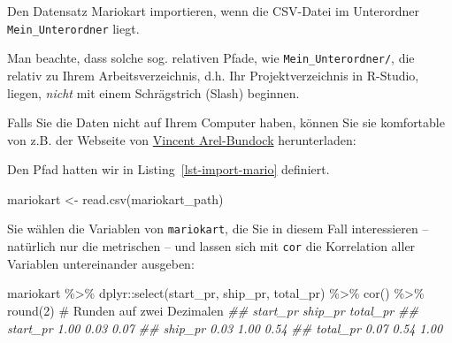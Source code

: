 \documentclass[
  letterpaper,
  oneside,
  open=any]{scrbook}
\newenvironment{Shaded}{\begin{snugshade}}{\end{snugshade}}
\newcommand{\CommentTok}[1]{\textcolor[rgb]{0.37,0.37,0.37}{#1}}
\newcommand{\DecValTok}[1]{\textcolor[rgb]{0.68,0.00,0.00}{#1}}
\newcommand{\DocumentationTok}[1]{\textcolor[rgb]{0.37,0.37,0.37}{\textit{#1}}}
\newcommand{\FunctionTok}[1]{\textcolor[rgb]{0.28,0.35,0.67}{#1}}
\newcommand{\NormalTok}[1]{\textcolor[rgb]{0.00,0.23,0.31}{#1}}
\newcommand{\OtherTok}[1]{\textcolor[rgb]{0.00,0.23,0.31}{#1}}
\newcommand{\SpecialCharTok}[1]{\textcolor[rgb]{0.37,0.37,0.37}{#1}}
\newcommand{\StringTok}[1]{\textcolor[rgb]{0.13,0.47,0.30}{#1}}
\theoremstyle{definition}
\theoremstyle{definition}
\theoremstyle{definition}
\theoremstyle{remark}
\begin{document}
\begin{codelisting}

\caption{\label{lst-mario-unterordner}Den Datensatz Mariokart
importieren, wenn die CSV-Datei im Unterordner
\texttt{Mein\_Unterordner} liegt.}

\centering{

\begin{Shaded}
\begin{Highlighting}[]
\NormalTok{mariokart }\OtherTok{\textless{}{-}} \FunctionTok{read.csv}\NormalTok{(}\StringTok{"Mein\_Unterordner/mariokart.csv"}\NormalTok{)}
\end{Highlighting}
\end{Shaded}

}

\end{codelisting}%

Man beachte, dass solche sog. relativen Pfade, wie
\texttt{Mein\_Unterordner/}, die relativ zu Ihrem Arbeitsverzeichnis,
d.h. Ihr Projektverzeichnis in R-Studio, liegen, \emph{nicht} mit einem
Schrägstrich (Slash) beginnen.

Falls Sie die Daten nicht auf Ihrem Computer haben, können Sie sie
komfortable von z.B. der Webseite von
\href{https://vincentarelbundock.github.io/Rdatasets}{Vincent
Arel-Bundock} herunterladen:

Den Pfad hatten wir in Listing~\ref{lst-import-mario} definiert.

\begin{Shaded}
\begin{Highlighting}[]
\NormalTok{mariokart }\OtherTok{\textless{}{-}} \FunctionTok{read.csv}\NormalTok{(mariokart\_path)}
\end{Highlighting}
\end{Shaded}

Sie wählen die Variablen von \texttt{mariokart}, die Sie in diesem Fall
interessieren -- natürlich nur die metrischen -- und lassen sich mit
\texttt{cor} die Korrelation aller Variablen untereinander ausgeben:

\begin{Shaded}
\begin{Highlighting}[]
\NormalTok{mariokart }\SpecialCharTok{\%\textgreater{}\%}  
\NormalTok{  dplyr}\SpecialCharTok{::}\FunctionTok{select}\NormalTok{(start\_pr, ship\_pr, total\_pr) }\SpecialCharTok{\%\textgreater{}\%} 
  \FunctionTok{cor}\NormalTok{() }\SpecialCharTok{\%\textgreater{}\%} 
  \FunctionTok{round}\NormalTok{(}\DecValTok{2}\NormalTok{) }\CommentTok{\# Runden auf zwei Dezimalen}
\DocumentationTok{\#\#          start\_pr ship\_pr total\_pr}
\DocumentationTok{\#\# start\_pr     1.00    0.03     0.07}
\DocumentationTok{\#\# ship\_pr      0.03    1.00     0.54}
\DocumentationTok{\#\# total\_pr     0.07    0.54     1.00}
\end{Highlighting}
\end{Shaded}
\end{document}
